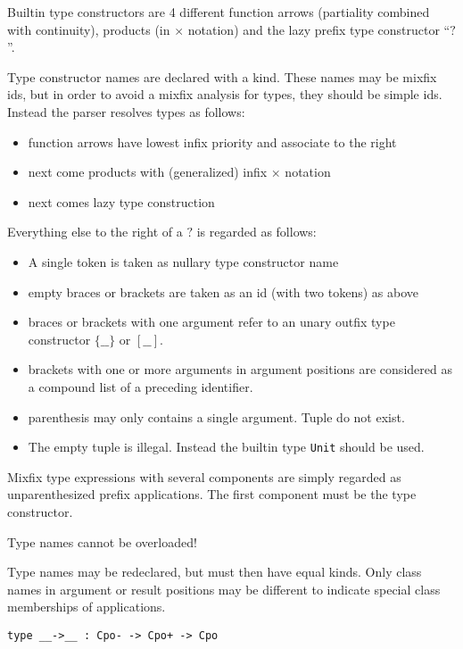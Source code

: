 \documentclass{article}
\begin{document}
Builtin type constructors are 4 different function arrows (partiality combined
with continuity), products (in $\times$ notation) and the lazy
prefix type constructor ``$?$''.

Type constructor names are declared with a kind. These names may be mixfix
ids, but in order to avoid a mixfix analysis for types, they should be
simple ids. Instead the parser resolves types as follows:

\begin{itemize}
\item function arrows have lowest infix priority and associate to the right
\item next come products with (generalized) infix $\times$ notation
\item next comes lazy type construction
\end{itemize}

Everything else to the right of a $?$ is regarded as follows:

\begin{itemize}
\item A single token is taken as nullary type constructor name
\item empty braces or brackets are taken as an id (with two tokens) as above
\item braces or brackets with one argument refer to an unary outfix type
  constructor $\{\_\_\}$ or $[\_\_]$.
\item brackets with one or more arguments in argument positions are considered
  as a compound list of a preceding identifier. 
\item parenthesis may only contains a single argument. Tuple do not exist.
\item The empty tuple is illegal. Instead the builtin type 
  \texttt{Unit} should be used.
\end{itemize}

Mixfix type expressions with several components are simply regarded as
unparenthesized prefix applications. The first component must be the
type constructor.

Type names cannot be overloaded! 

Type names may be redeclared, but must then have equal kinds. Only
class names in argument or result positions may be different to indicate
special class memberships of applications.

\begin{verbatim}
type __->__ : Cpo- -> Cpo+ -> Cpo
\end{verbatim}
\end{document}
